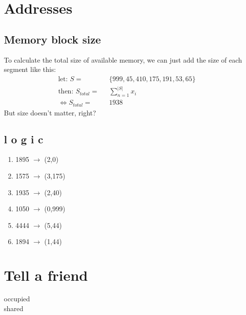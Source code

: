 \documentclass[a4paper, 11pt]{article}
\begin{document}
\section{Addresses}
\subsection{Memory block size}
To calculate the total size of available memory, we can just add the size of each segment like this:
\begin{align}
  \mbox{let: } S=&\mbox{ } \{999,45,410,175,191,53,65\}\\
  \mbox{then: } S_{total} =&\mbox{ } \sum_{n=1}^{|S|} x_i\\
  \Leftrightarrow S_{total} =&\mbox{ } 1938
\end{align}
But size doesn't matter, right? 

\subsection{l o g i c}
\begin{enumerate}
  \item 1895 $\rightarrow$ (2,0)
  \item 1575 $\rightarrow$ (3,175)
  \item 1935 $\rightarrow$ (2,40)
  \item 1050 $\rightarrow$ (0,999)
  \item 4444 $\rightarrow$ (5,44)
  \item 1894 $\rightarrow$ (1,44) 
\end{enumerate}
\newpage

\section{Tell a friend}
\quad occupied\\
\quad shared
\end{document}
